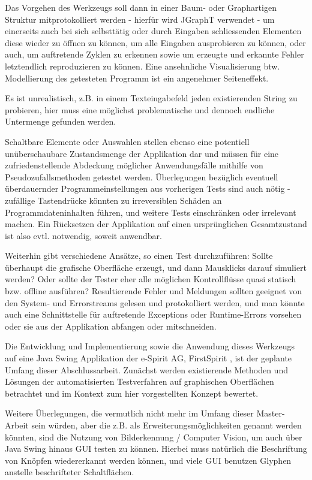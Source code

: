 Das Vorgehen des Werkzeugs soll dann in einer Baum- oder Graphartigen
Struktur mitprotokolliert werden - hierfür wird JGraphT verwendet \cite{website:jgrapht} - 
um einerseits auch bei sich selbsttätig oder durch Eingaben schliessenden Elementen diese wieder
zu öffnen zu können, um alle Eingaben ausprobieren zu können, oder auch, um auftretende Zyklen 
zu erkennen sowie um erzeugte und erkannte Fehler letztendlich reproduzieren zu können.
Eine ansehnliche Visualisierung btw. Modellierung des getesteten Programm ist ein angenehmer
Seiteneffekt.

Es ist unrealistisch, z.B. in
einem Texteingabefeld jeden existierenden String zu probieren, hier muss eine möglichst
problematische und dennoch endliche Untermenge gefunden werden.

Schaltbare Elemente oder Auswahlen stellen ebenso
eine potentiell unüberschaubare Zustandsmenge der Applikation dar und müssen für eine
zufriedenstellende Abdeckung möglicher Anwendungsfälle mithilfe von
Pseudozufallsmethoden getestet werden. Überlegungen bezüglich eventuell überdauernder Programmeinstellungen
aus vorherigen Tests sind auch nötig - zufällige Tastendrücke könnten zu irreversiblen Schäden an
Programmdateninhalten führen, und weitere Tests einschränken oder irrelevant machen. Ein Rücksetzen
der Applikation auf einen ursprünglichen Gesamtzustand ist also evtl. notwendig, soweit anwendbar.
 
Weiterhin gibt verschiedene Ansätze, so einen Test durchzuführen: Sollte überhaupt die
grafische Oberfläche erzeugt, und dann Mausklicks darauf simuliert werden? Oder sollte der
Tester eher alle möglichen Kontrollflüsse quasi statisch bzw. offline ausführen? Resultierende
Fehler und Meldungen sollten geeignet von den System- und Errorstreams gelesen und
protokolliert werden, und man könnte auch eine Schnittstelle für auftretende Exceptions oder
Runtime-Errors vorsehen oder sie aus der Applikation abfangen oder mitschneiden. 
 
Die Entwicklung und Implementierung sowie die Anwendung dieses Werkzeugs auf eine Java
Swing Applikation der e-Spirit AG, FirstSpirit \cite{website:firstspirit}, ist der geplante 
Umfang dieser Abschlussarbeit. Zunächst werden existierende Methoden und Lösungen der automatisierten
Testverfahren auf graphischen Oberflächen betrachtet und im Kontext zum hier vorgestellten Konzept
bewertet.
 
Weitere Überlegungen, die vermutlich nicht mehr im Umfang dieser Master-Arbeit sein
würden, aber die z.B. als Erweiterungsmöglichkeiten genannt werden könnten, sind die
Nutzung von Bilderkennung / Computer Vision, um auch über Java Swing hinaus GUI testen zu
können. Hierbei muss natürlich die Beschriftung von Knöpfen wiedererkannt werden können,
und viele GUI benutzen Glyphen anstelle beschrifteter Schaltflächen. 
